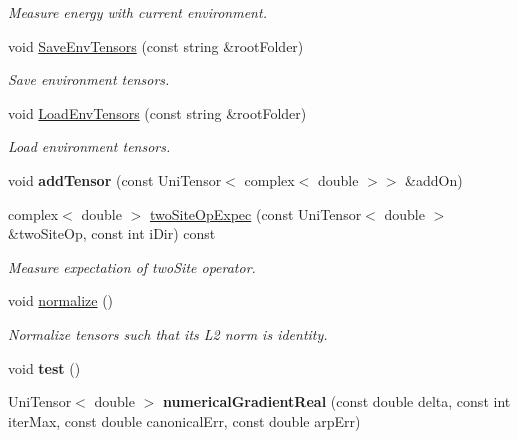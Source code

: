 \begin{DoxyCompactItemize}
\begin{DoxyCompactList}\small\item\em Measure energy with current environment. \end{DoxyCompactList}\item 
void \hyperlink{classchannel_a8e8bce047890d3f7ad693feb2cc05843}{Save\+Env\+Tensors} (const string \&root\+Folder)
\begin{DoxyCompactList}\small\item\em Save environment tensors. \end{DoxyCompactList}\item 
void \hyperlink{classchannel_a1ea23994c6c9eb45726a69f285a9a3bc}{Load\+Env\+Tensors} (const string \&root\+Folder)
\begin{DoxyCompactList}\small\item\em Load environment tensors. \end{DoxyCompactList}\item 
void {\bfseries add\+Tensor} (const Uni\+Tensor$<$ complex$<$ double $>$$>$ \&add\+On)\hypertarget{classchannel_afd911769e2339ae9bc35c06fcea2eba8}{}\label{classchannel_afd911769e2339ae9bc35c06fcea2eba8}

\item 
complex$<$ double $>$ \hyperlink{classchannel_a6cd95cb7ab6c85ea78f202dcb12eadb5}{two\+Site\+Op\+Expec} (const Uni\+Tensor$<$ double $>$ \&two\+Site\+Op, const int i\+Dir) const 
\begin{DoxyCompactList}\small\item\em Measure expectation of two\+Site operator. \end{DoxyCompactList}\item 
void \hyperlink{classchannel_a2b90295762c16c073b10144c500dffc1}{normalize} ()\hypertarget{classchannel_a2b90295762c16c073b10144c500dffc1}{}\label{classchannel_a2b90295762c16c073b10144c500dffc1}

\begin{DoxyCompactList}\small\item\em Normalize tensors such that its L2 norm is identity. \end{DoxyCompactList}\item 
void {\bfseries test} ()\hypertarget{classchannel_a279ea6f4935c4b12b484735c28b89c52}{}\label{classchannel_a279ea6f4935c4b12b484735c28b89c52}

\item 
Uni\+Tensor$<$ double $>$ {\bfseries numerical\+Gradient\+Real} (const double delta, const int iter\+Max, const double canonical\+Err, const double arp\+Err)\hypertarget{classchannel_a3b4bace51a92771c6f11d76df6d42cb7}{}\label{classchannel_a3b4bace51a92771c6f11d76df6d42cb7}


\end{DoxyCompactItemize}
